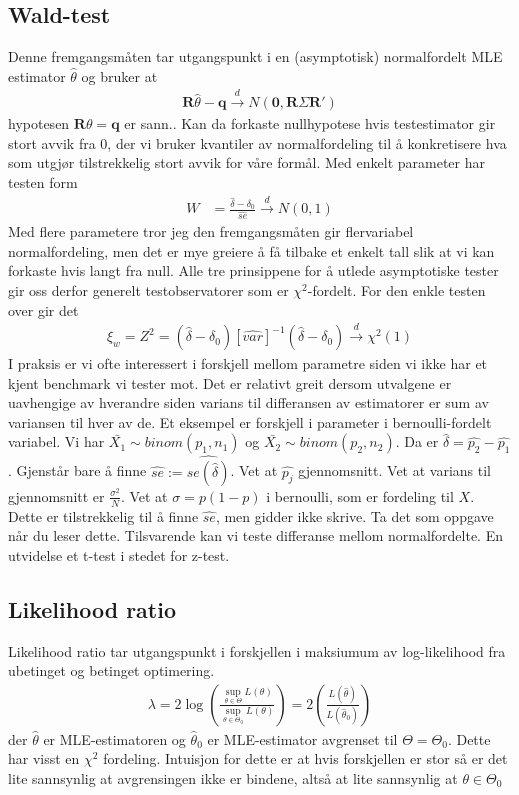 \subsection{Wald-test}
Denne fremgangsmåten tar utgangspunkt i en (asymptotisk) normalfordelt MLE estimator $\hat{\theta}$ og bruker at 
\begin{align}
\mathbf{R}\hat{\theta}-\mathbf{q} \overset{d}{\to} N(\mathbf{0},\mathbf{R}\Sigma\mathbf{R}') 
\end{align}
hypotesen $\mathbf{R}\theta=\mathbf{q}$ er sann.. Kan da forkaste nullhypotese hvis testestimator gir stort avvik fra 0, der vi bruker kvantiler av normalfordeling til å konkretisere hva som utgjør tilstrekkelig stort avvik for våre formål. Med enkelt parameter har testen form
\begin{align}
W &= \frac{\hat{\delta}-\delta_0}{\hat{se}} \overset{d}{\to} N(0,1) 
\end{align}
Med flere parametere tror jeg den fremgangsmåten gir flervariabel normalfordeling, men det er mye greiere å få tilbake et enkelt tall slik at vi kan forkaste hvis langt fra null. Alle tre prinsippene for å utlede asymptotiske tester gir oss derfor generelt testobservatorer som er $\chi^2$-fordelt. For den enkle testen over gir det
\begin{align}
\xi_w = Z^2 = (\hat{\delta}-\delta_0)[\hat{var}]^{-1}(\hat{\delta}-\delta_0) \overset{d}{\to} \chi^2(1)
\end{align}
I praksis er vi ofte interessert i forskjell mellom parametre siden vi ikke har et kjent benchmark vi tester mot. Det er relativt greit dersom utvalgene er uavhengige av hverandre siden varians til differansen av estimatorer er sum av variansen til hver av de. Et eksempel er forskjell i parameter i bernoulli-fordelt variabel. Vi har $\bar{X_1} \sim binom(p_1,n_1)$ og $\bar{X_2} \sim binom(p_2,n_2)$. Da er $\hat{\delta} = \hat{p_2}-\hat{p_1}$. Gjenstår bare å finne $\hat{se} := \widehat{se(\hat{\delta})}$. Vet at $\hat{p_j}$ gjennomsnitt. Vet at varians til gjennomsnitt er $\frac{\sigma^2}{N}$. Vet at $\sigma=p(1-p)$ i bernoulli, som er fordeling til $X$. Dette er tilstrekkelig til å finne $\hat{se}$, men gidder ikke skrive. Ta det som oppgave når du leser dette. Tilsvarende kan vi teste differanse mellom normalfordelte. En utvidelse et t-test i stedet for z-test.
\subsection{Likelihood ratio}
Likelihood ratio tar utgangspunkt i forskjellen i maksiumum av log-likelihood fra ubetinget og betinget optimering.
\begin{align}
\lambda = 2\log\left(\frac{\sup_{\theta \in \Theta}L(\theta)}{\sup_{\theta \in \Theta_0}L(\theta)}\right) 
= 2\left(\frac{L(\hat{\theta})}{L(\hat{\theta}_0)}\right)
\end{align}
der $\hat{\theta}$ er MLE-estimatoren og $\hat{\theta}_0$ er MLE-estimator avgrenset til $\Theta = \Theta_0$. Dette har visst en $\chi^2$ fordeling.  Intuisjon for dette er at hvis forskjellen er stor så er det lite sannsynlig at avgrensingen ikke er bindene, altså at lite sannsynlig at $\theta \in \Theta_0$

